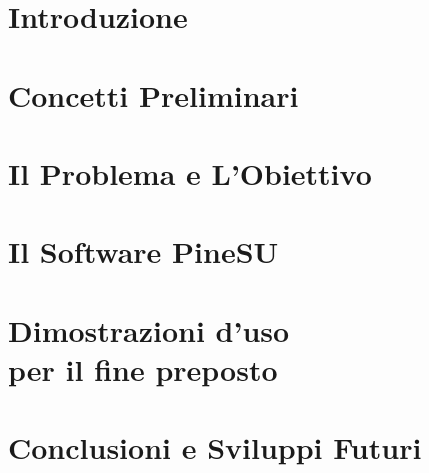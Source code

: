 \documentclass[12pt,a4paper]{report}
\begin{document}
\tableofcontents


 
\chapter{Introduzione}

%

\chapter{Concetti Preliminari}



\chapter{Il Problema e L’Obiettivo}



\chapter{Il Software PineSU}



\chapter{Dimostrazioni d’uso\\per il fine preposto}



\chapter{Conclusioni e Sviluppi Futuri}







\cleardoublepage{} %
\end{document}
